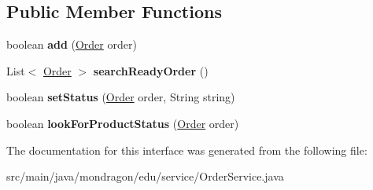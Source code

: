 \subsection*{Public Member Functions}
\begin{DoxyCompactItemize}
\item 
\mbox{\label{interfacemondragon_1_1edu_1_1service_1_1_order_service_aa6995d1a712f00ac1c523b5c4b1a8a5d}} 
boolean {\bfseries add} (\mbox{\hyperlink{classmondragon_1_1edu_1_1clases_1_1_order}{Order}} order)
\item 
\mbox{\label{interfacemondragon_1_1edu_1_1service_1_1_order_service_a6cbdfcafb46f166c5de0b553a00b2a12}} 
List$<$ \mbox{\hyperlink{classmondragon_1_1edu_1_1clases_1_1_order}{Order}} $>$ {\bfseries search\+Ready\+Order} ()
\item 
\mbox{\label{interfacemondragon_1_1edu_1_1service_1_1_order_service_a72e3ff3d9078f3d06e07f41429183249}} 
boolean {\bfseries set\+Status} (\mbox{\hyperlink{classmondragon_1_1edu_1_1clases_1_1_order}{Order}} order, String string)
\item 
\mbox{\label{interfacemondragon_1_1edu_1_1service_1_1_order_service_a1507b85f306bf4116de6c363afe4d5c4}} 
boolean {\bfseries look\+For\+Product\+Status} (\mbox{\hyperlink{classmondragon_1_1edu_1_1clases_1_1_order}{Order}} order)
\end{DoxyCompactItemize}


The documentation for this interface was generated from the following file\+:\begin{DoxyCompactItemize}
\item 
src/main/java/mondragon/edu/service/Order\+Service.\+java\end{DoxyCompactItemize}
